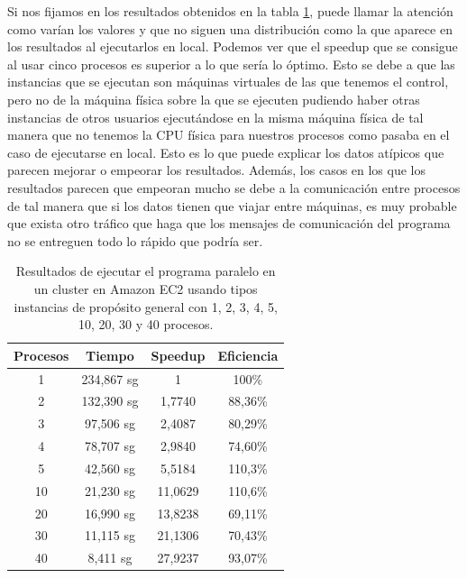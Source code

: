 \documentclass{article}
\begin{document}
	Si nos fijamos en los resultados obtenidos en la tabla \ref{tab:resultadosClusterM}, puede llamar la atención como varían los valores y que no siguen una distribución como la que aparece en los resultados al ejecutarlos en local. Podemos ver que el speedup que se consigue al usar cinco procesos es superior a lo que sería lo óptimo. Esto se debe a que las instancias que se ejecutan son máquinas virtuales de las que tenemos el control, pero no de la máquina física sobre la que se ejecuten pudiendo haber otras instancias de otros usuarios ejecutándose en la misma máquina física de tal manera que no tenemos la CPU física para nuestros procesos como pasaba en el caso de ejecutarse en local. Esto es lo que puede explicar los datos atípicos que parecen mejorar o empeorar los resultados. Además,  los casos en los que los resultados parecen que empeoran mucho  se debe a la comunicación entre procesos de tal manera que si los datos tienen que viajar entre máquinas, es muy probable que exista otro tráfico que haga que los mensajes de comunicación del programa no se entreguen todo lo rápido que podría ser.
	
\begin{table}[h]
	\begin{center}
		\caption{Resultados de ejecutar el programa paralelo en un cluster en Amazon EC2 usando tipos instancias de propósito general con 1, 2, 3, 4, 5, 10, 20, 30 y 40 procesos.}
		\begin{tabular}{|c|c|c|c|}
\hline
\textbf{Procesos} &
\textbf{Tiempo} &
\textbf{Speedup} &
\textbf{Eficiencia} \\ \hline
\hline
 1 &234,867 sg &  1          & 100\% \\ \hline
 2 &132,390 sg &  1,7740 & 88,36\% \\ \hline 
 3 & 97,506 sg &  2,4087 & 80,29\% \\ \hline
 4 & 78,707 sg &  2,9840 & 74,60\% \\ \hline
 5 & 42,560 sg &  5,5184 & 110,3\% \\ \hline
10 & 21,230 sg & 11,0629 & 110,6\% \\ \hline
20 & 16,990 sg &  13,8238& 69,11\% \\ \hline
30 & 11,115 sg & 21,1306 & 70,43\% \\ \hline
40 &  8,411 sg &  27,9237& 93,07\% \\ \hline
		\end{tabular}
		\label{tab:resultadosClusterM}
	\end{center}
\end{table}
\end{document}
